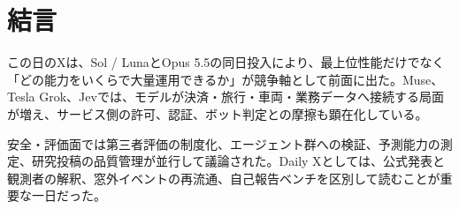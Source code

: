 \section*{結言}
この日のXは、Sol / LunaとOpus 5.5の同日投入により、最上位性能だけでなく「どの能力をいくらで大量運用できるか」が競争軸として前面に出た。Muse、Tesla Grok、Jevでは、モデルが決済・旅行・車両・業務データへ接続する局面が増え、サービス側の許可、認証、ボット判定との摩擦も顕在化している。

安全・評価面では第三者評価の制度化、エージェント群への検証、予測能力の測定、研究投稿の品質管理が並行して議論された。Daily Xとしては、公式発表と観測者の解釈、窓外イベントの再流通、自己報告ベンチを区別して読むことが重要な一日だった。
